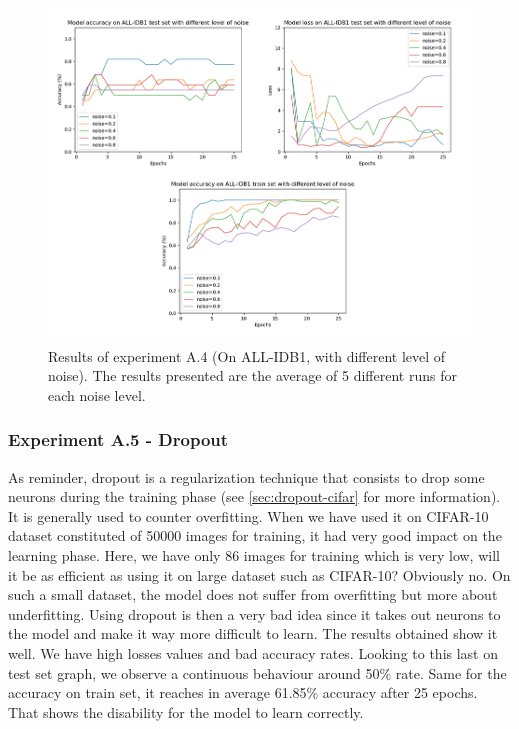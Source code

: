 \documentclass[11pt, openany]{report}
\theoremstyle{plain}
\theoremstyle{definition}
\theoremstyle{remark}
\begin{document}
\begin{figure}[H]
  \centering
  \includegraphics[scale=0.45]{Code/ch6-LeukemiaSubtypes/figures_result/ALL_IDB1/all_idb1-noise.PNG}
  \caption{Results of experiment A.4 (On ALL-IDB1, with different level of noise). The results presented are the average of 5 different runs for each noise level.}
  \label{fig:results-A4}
\end{figure}


\subsubsection{Experiment A.5 - Dropout}
As reminder, dropout is a regularization technique that consists to drop some neurons during the training phase (see \autoref{sec:dropout-cifar} for more information). It is generally used to counter overfitting. When we have used it on CIFAR-10 dataset constituted of 50000 images for training, it had very good impact on the learning phase. Here, we have only 86 images for training which is very low, will it be as efficient as using it on large dataset such as CIFAR-10? Obviously no. On such a small dataset, the model does not suffer from overfitting but more about underfitting. Using dropout is then a very bad idea since it takes out neurons to the model and make it way more difficult to learn. The results obtained show it well. We have high losses values and bad accuracy rates. Looking to this last on test set graph, we observe a continuous behaviour around 50\% rate. Same for the accuracy on train set, it reaches in average 61.85\% accuracy after 25 epochs. That shows the disability for the model to learn correctly.  
\end{document}
